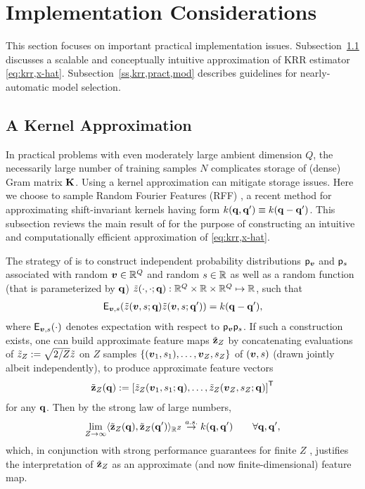 \section{Implementation Considerations}
\label{s,krr,pract}

This section focuses
on important practical implementation issues.
Subsection~\ref{ss,krr,pract,apprx} discusses
a scalable and conceptually intuitive approximation
of KRR estimator \eqref{eq:krr,x-hat}.
Subsection~\ref{ss,krr,pract,mod} describes guidelines
for nearly-automatic model selection.

\subsection{A Kernel Approximation}
\label{ss,krr,pract,apprx}

In practical problems
with even moderately large ambient dimension $Q$,
the necessarily large number of training samples $N$ 
complicates storage of (dense) Gram matrix $\mathbf{K}$.
Using a kernel approximation 
can mitigate storage issues.
Here we choose
to sample Random Fourier Features (RFF) \cite{rahimi:07:rff},
a recent method 
for approximating shift-invariant kernels
having form $k\paren{\bmq,\bmq'} \equiv k\paren{\bmq-\bmq'}$.
This subsection reviews the main result of \cite{rahimi:07:rff}
for the purpose of constructing 
an intuitive and computationally efficient approximation of \eqref{eq:krr,x-hat}.

The strategy of \cite{rahimi:07:rff}
is to construct independent probability distributions 
$\mathsf{p}_{\boldsymbol{v}}$ and $\mathsf{p}_{s}$
associated with
random $\boldsymbol{v} \in \mathbb{R}^{Q}$ 
and random $s \in \mathbb{R}$ 
as well as a random function 
(that is parameterized by $\mathbf{q}$) 
$\zt\paren{\cdot,\cdot;\bmq} : \reals{Q} \times \real \times \reals{Q} \mapsto \real$,
such that
\begin{align}
	\expect{\bmv,s}{
		\zta{\bmv,s;\bmq}
		\zta{\bmv,s;\bmq'} 
	}
	= k(\bmq-\bmq'),
	\label{eq:krr,exp}
\end{align}
where 
$\expect{\bmv,s}{\cdot}$
denotes expectation with respect to $\mathsf{p}_{\boldsymbol{v}}\mathsf{p}_{s}$.
If such a construction exists,
one can build
approximate feature maps $\tilde{\mathbf{z}}_Z$
by concatenating evaluations of 
$\tilde{z}_Z:= \sqrt{2/Z}\tilde{z}$ on 
$Z$ samples 
$\set{\paren{\bmv_1,s_1},\dots,\bmv_Z,s_Z}$
of $\paren{\bmv,s}$
(drawn jointly albeit independently),
to produce approximate feature vectors
\begin{align}
	\bmztZa{\bmq} := \brac{\ztZa{\bmv_1,s_1;\bmq},\dots,\ztZa{\bmv_Z,s_Z;\bmq}}\tpose
	\label{eq:krr,feat}
\end{align}
for any $\mathbf{q}$. 
Then by the strong law of large numbers,
\begin{align}
	\lim_{Z \to \infty} \innprod{
		\bmztZa{\bmq}}{
		\bmztZa{\bmq'}
	}_{\reals{Z}} \overset{a.s.}{\to} k(\bmq,\bmq') \qquad \forall \bmq,\bmq',
	\label{eq:krr,lln}
\end{align}
which, 
in conjunction 
with strong performance guarantees
for finite $Z$ \cite{rahimi:07:rff,sutherland:15:ote}, 
justifies the interpretation 
of $\tilde{\mathbf{z}}_Z$ as an approximate 
(and now finite-dimensional) feature map.

